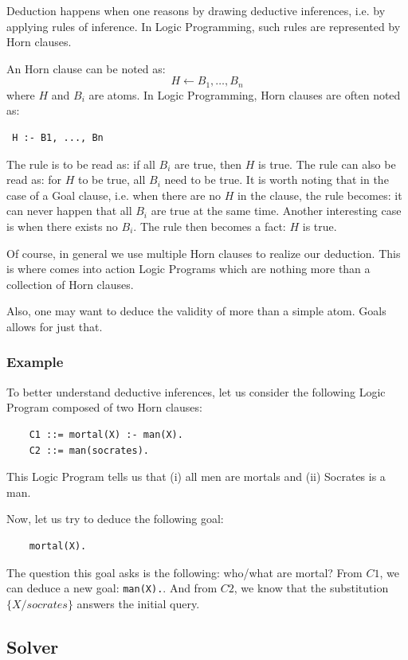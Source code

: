 \documentclass{article}
\begin{document}
Deduction happens when one reasons by drawing deductive inferences, i.e. by
applying rules of inference. In Logic Programming, such rules are represented 
by Horn clauses. 

An Horn clause can be noted as:
$$ H \leftarrow B_1, \dots, B_n $$
where $H$ and $B_i$ are atoms. In Logic Programming, Horn clauses are often
noted as:
\begin{verbatim} H :- B1, ..., Bn \end{verbatim}

The rule is to be read as: if all $B_i$ are true, then $H$ is true. The rule
can also be read as: for $H$ to be true, all $B_i$ need to be true.
It is worth noting that in the case of a Goal clause, i.e. when there are no 
$H$ in the clause, the rule becomes: it can never happen that all $B_i$ are
true at the same time.
Another interesting case is when there exists no $B_i$. The rule then becomes a
fact: $H$ is true.

Of course, in general we use multiple Horn clauses to realize our deduction. 
This is where comes into action Logic Programs which are nothing more than a 
collection of Horn clauses.

Also, one may want to deduce the validity of more than a simple atom. Goals 
allows for just that.

\subsubsection*{Example} \label{logicProgramming:deduction:example}

To better understand deductive inferences, let us consider the following Logic
Program composed of two Horn clauses:
\begin{verbatim}
    C1 ::= mortal(X) :- man(X).
    C2 ::= man(socrates).
\end{verbatim}
This Logic Program tells us that (i) all men are mortals and (ii) Socrates is a
man.

Now, let us try to deduce the following goal:
\begin{verbatim}
    mortal(X).
\end{verbatim}
The question this goal asks is the following: who/what are mortal? From $C1$,
we can deduce a new goal: \Verb#man(X).#. And from $C2$, we know that the
substitution $\{X/socrates\}$ answers the initial query.

\subsection{Solver} \label{logicProgramming:solver}
\end{document}
